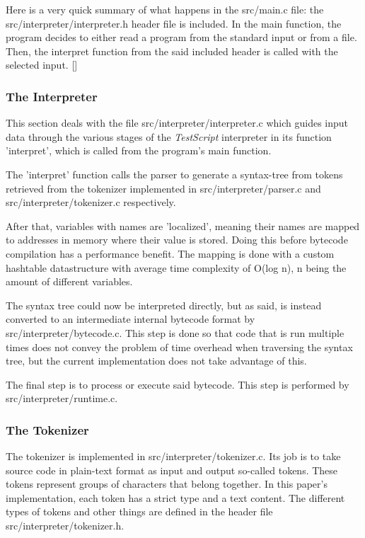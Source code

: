 \documentclass[12pt,a4paper]{article}
\newcommand{\name}{\emph{TestScript}}
\begin{document}
Here is a very quick summary of what happens in the src/main.c file: the src/interpreter/interpreter.h
header file is included. In the main function, the program decides to either
read a program from the standard input or from a file. Then, the interpret function
from the said included header is called with the selected input.
[]

\subsubsection{The Interpreter}
This section deals with the file src/interpreter/interpreter.c which guides
input data through the various stages of the \name{} interpreter in its
function 'interpret', which is called from the program's main function.

The 'interpret' function calls the parser to generate a syntax-tree from tokens retrieved
from the tokenizer implemented in src/interpreter/parser.c and 
src/interpreter/tokenizer.c respectively.

After that, variables with names are 'localized', meaning their names are
mapped to addresses in memory where their value is stored. Doing this before
bytecode compilation has a performance benefit. 
The mapping is done with a custom hashtable datastructure with average time
complexity of O(log n), n being the amount of different variables.

The syntax tree could now be interpreted directly, but as said, is instead converted
to an intermediate internal bytecode format by src/interpreter/bytecode.c.
This step is done so that code that is run multiple times does not convey
the problem of time overhead when traversing the syntax tree, but the current
implementation does not take advantage of this.

The final step is to process or execute said bytecode. This step is performed
by src/interpreter/runtime.c.

\subsubsection{The Tokenizer}
The tokenizer is implemented in src/interpreter/tokenizer.c. Its job is to
take source code in plain-text format as input and output so-called tokens.
These tokens represent groups of characters that belong together. In this paper's
implementation, each token has a strict type and a text content.
The different types of tokens and other things are defined in the header file
src/interpreter/tokenizer.h.
\end{document}
